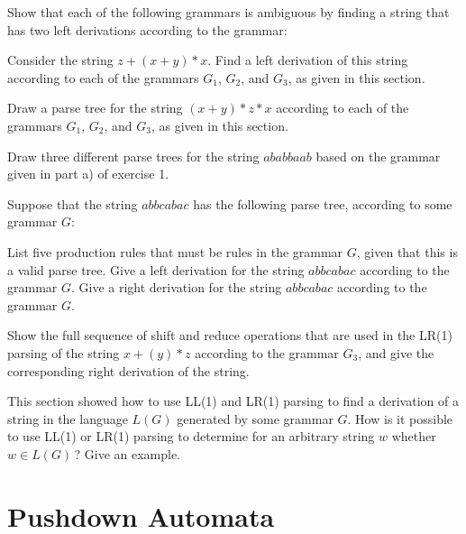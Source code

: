 \begin{exercises}

\problem Show that each of the following grammars is ambiguous by finding
a string that has two left derivations according to the grammar:

\problem Consider the string $z+(x+y)*x$.  Find a left derivation
of this string according to each of the grammars $G_1$, $G_2$, and
$G_3$, as given in this section.

\problem Draw a parse tree for the string $(x+y)*z*x$ according to
each of the grammars $G_1$, $G_2$, and $G_3$, as given in this section.

\problem Draw three different parse trees for the string
$ababbaab$ based on the grammar given in part a) of exercise 1.

\problem Suppose that the string $abbcabac$ has the following parse
tree, according to some grammar $G$:

\centerline{}
\medskip

\ppart List five production rules that must be rules in the grammar $G$,
given that this is a valid parse tree.
\ppart Give a left derivation for the string $abbcabac$ according to the
grammar $G$.
\ppart Give a right derivation for the string $abbcabac$ according to the
grammar $G$.

\problem Show the full sequence of shift and reduce operations
that are used in the LR(1) parsing of the string $x+(y)*z$ according
to the grammar $G_3$, and give the corresponding right derivation
of the string.

\problem This section showed how to use LL(1) and LR(1) parsing to
find a derivation of a string in the language $L(G)$ generated by
some grammar $G$.  How is it possible to use LL(1) or LR(1) parsing
to determine for an arbitrary string $w$ whether $w\in L(G)\,$?
Give an example.

\end{exercises}


\section{Pushdown Automata}\label{S-grammars-3b}

